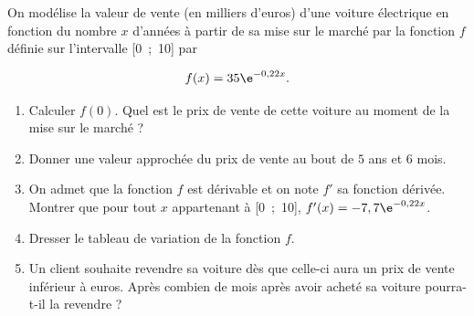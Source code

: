 \medskip

On modélise la valeur de vente (en milliers d'euros) d'une voiture électrique en fonction du
nombre $x$ d'années à partir de sa mise sur le marché par la fonction $f$ définie sur l'intervalle
[0~;~10] par

\[f(x) = 35\e^{-0,22x} .\]

\smallskip
\begin{enumerate}
\item Calculer $f(0)$. Quel est le prix de vente de cette voiture au moment de la mise sur le
marché ?
\item Donner une valeur approchée du prix de vente au bout de $5$ ans et $6$ mois.
\item On admet que la fonction $f$ est dérivable et on note $f'$ sa fonction dérivée. Montrer
que pour tout $x$ appartenant à [0~;~10], $f'(x) = - 7,7\e^{- 0,22x}$.
\item Dresser le tableau de variation de la fonction $f$.
\item Un client souhaite revendre sa voiture dès que celle-ci aura un prix de vente inférieur
à  euros. Après combien de mois après avoir acheté sa voiture pourra-t-il la
revendre ?
\end{enumerate}
